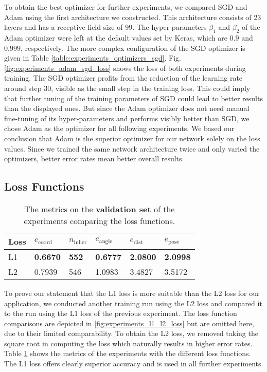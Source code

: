 To obtain the best optimizer for further experiments, we compared SGD and Adam using the first architecture we constructed. This architecture consists of 23 layers and has a receptive field-size of 99. The hyper-parameters $\beta_1$ and $\beta_2$ of the Adam optimizer were left at the default values set by Keras, which are $0.9$ and $0.999$, respectively. The more complex configuration of the SGD optimizer is given in Table \ref{table:experiments_optimizers_sgd}. Fig. \ref{fig:experiments_adam_sgd_loss} shows the loss of both experiments during training. The SGD optimizer profits from the reduction of the learning rate around step 30, visible as the small step in the training loss. This could imply that further tuning of the training parameters of SGD could lead to better results than the displayed ones. But since the Adam optimizer does not need manual fine-tuning of its hyper-parameters and performs visibly better than SGD, we chose Adam as the optimizer for all following experiments. We based our conclusion that Adam is the superior optimizer for our network solely on the loss values. Since we trained the same network architecture twice and only varied the optimizers, better error rates mean better overall results.

\subsection{Loss Functions}

\begin{table}[]
\centering
\begin{tabular}{|l||lllll|}
\hline 
 Loss  & $e_{\text{coord}}$ & $n_{\text{inlier}}$ & $e_{\text{angle}}$ & $e_{\text{dist}}$  & $e_{\text{pose}}$ \\ \hline \hline \rowcolor{Gray}
L1 & \textbf{0.6670} & \textbf{552} & \textbf{0.6777} & \textbf{2.0800} & \textbf{2.0998}  \\
L2 & 0.7939                                                            & 546    & 1.0983      & 3.4827 & 3.5172 \\ \hline   
\end{tabular}
\caption{The metrics on the \textbf{validation set} of the experiments comparing the loss functions.}
\label{table:experiments_loss_functions}
\end{table}

To prove our statement that the L1 loss is more suitable than the L2 loss for our application, we conducted another training run using the L2 loss and compared it to the run using the L1 loss of the previous experiment. The loss function comparisons are depicted in \ref{fig:experiments_l1_l2_loss} but are omitted here, due to their limited comparability. To obtain the L2 loss, we removed taking the square root in computing the loss which naturally results in higher error rates. Table \ref{table:experiments_loss_functions} shows the metrics of the experiments with the different loss functions. The L1 loss offers clearly superior accuracy and is used in all further experiments.

